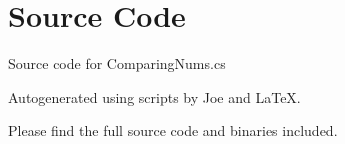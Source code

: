 \documentclass[12pt]{article}
\begin{document}
\maketitle
\pagebreak


\section{Source Code}

Source code for \textsf{ComparingNums.cs}


\newpage



\newpage

Autogenerated using scripts by Joe and \LaTeX.

Please find the full source code and binaries included.
\end{document}
